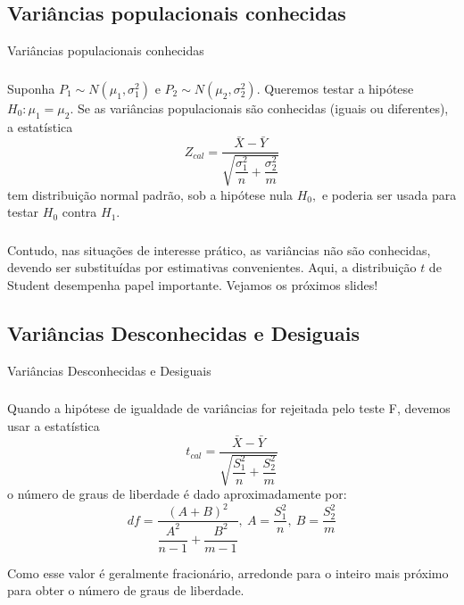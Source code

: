 \documentclass[14pt,aspectratio=1610]{beamer}
\newcommand{\Ho}{\ensuremath{H_{0}}}
\newcommand{\Hi}{\ensuremath{H_{1}}}
\begin{document}
\subsection{Variâncias populacionais conhecidas}
\begin{frame}{Variâncias populacionais conhecidas}
\frametitle{}
\begin{block}{}
\justifying
Suponha $P_{1}\sim N(\mu_{1},\sigma_{1}^{2})$ e $P_{2}\sim N(\mu_{2},\sigma_{2}^{2}).$ Queremos testar a hipótese $H_{0}:\mu_{1}=\mu_{2}.$ Se as variâncias populacionais são conhecidas (iguais ou diferentes), a estatística $$Z_{cal}=\dfrac{\bar{X}-\bar{Y}}{\sqrt{\dfrac{\sigma_{1}^{2}}{n}+\dfrac{\sigma_{2}^{2}}{m}}}$$ tem distribuição normal padrão, sob a hipótese nula $H_{0},$ e poderia ser usada para testar $\Ho$ contra $\Hi$.
\end{block}
\end{frame}

\begin{frame}{}
\frametitle{}
\begin{block}{}
\justifying
Contudo, nas situações de interesse prático, as variâncias não são conhecidas, devendo ser substituídas por estimativas convenientes. Aqui, a distribuição $t$ de Student desempenha papel importante. Vejamos os próximos slides!
\end{block}
\end{frame}

\subsection{Variâncias Desconhecidas e Desiguais}
\begin{frame}{Variâncias Desconhecidas e Desiguais}
\frametitle{}
\small
\begin{block}{}
\justifying
Quando a hipótese de igualdade de variâncias for rejeitada pelo teste F, devemos usar a estatística $$t_{cal}=\dfrac{\bar{X}-\bar{Y}}{\sqrt{\dfrac{S_{1}^{2}}{n}+\dfrac{S_{2}^{2}}{m}}}$$ o número de graus de liberdade é dado aproximadamente por:
\vspace{-0.2cm}
$$df=\dfrac{(A+B)^{2}}{\dfrac{A^{2}}{n-1}+\dfrac{B^{2}}{m-1}},\ 
A=\dfrac{S_{1}^{2}}{n},\ B=\dfrac{S_{2}^{2}}{m}$$
\end{block}\pause
\vspace{-0.5cm}
\begin{block}{}
Como esse valor é geralmente fracionário, arredonde para o inteiro mais próximo
para obter o número de graus de liberdade.
\end{block}
\end{frame}
\end{document}
